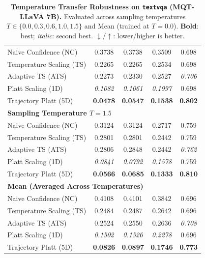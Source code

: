 \begin{table}[t]
{\begin{tabular}{lcccc}
\midrule
Naive Confidence (NC) & 0.3738 & 0.3738 & 0.3509 & 0.698 \\
Temperature Scaling (TS) & 0.2265 & 0.2265 & 0.2534 & 0.698 \\
Adaptive TS (ATS) & 0.2273 & 0.2330 & 0.2527 & \textit{0.706} \\
Platt Scaling (1D) & \textit{0.1082} & \textit{0.1061} & \textit{0.1997} & 0.698 \\
Trajectory Platt (5D) & \textbf{0.0478} & \textbf{0.0547} & \textbf{0.1538} & \textbf{0.802} \\
\midrule
\multicolumn{5}{l}{\textbf{Sampling Temperature $T = 1.5$}} \\
\midrule
Naive Confidence (NC) & 0.3124 & 0.3124 & 0.2717 & 0.759 \\
Temperature Scaling (TS) & 0.2801 & 0.2801 & 0.2442 & 0.759 \\
Adaptive TS (ATS) & 0.2806 & 0.2848 & 0.2442 & \textit{0.762} \\
Platt Scaling (1D) & \textit{0.0841} & \textit{0.0792} & \textit{0.1578} & 0.759 \\
Trajectory Platt (5D) & \textbf{0.0566} & \textbf{0.0685} & \textbf{0.1333} & \textbf{0.810} \\
\midrule
\multicolumn{5}{l}{\textbf{Mean (Averaged Across Temperatures)}} \\
\midrule
Naive Confidence (NC) & 0.4108 & 0.4101 & 0.3842 & 0.696 \\
Temperature Scaling (TS) & 0.2484 & 0.2487 & 0.2642 & 0.696 \\
Adaptive TS (ATS) & 0.2524 & 0.2550 & 0.2636 & \textit{0.708} \\
Platt Scaling (1D) & \textit{0.1502} & \textit{0.1526} & \textit{0.2278} & 0.696 \\
Trajectory Platt (5D) & \textbf{0.0826} & \textbf{0.0897} & \textbf{0.1746} & \textbf{0.773} \\
\bottomrule
\end{tabular}%
}
\caption{\textbf{Temperature Transfer Robustness on \texttt{textvqa} (MQT-LLaVA 7B).} Evaluated across sampling temperatures $T \in \{0.0, 0.3, 0.6, 1.0, 1.5\}$ and Mean (trained at $T=0.0$). \textbf{Bold}: best; \textit{italic}: second best. $\downarrow$/$\uparrow$: lower/higher is better.}
\label{tab:temp_transfer_mqt_textvqa}
\end{table}
